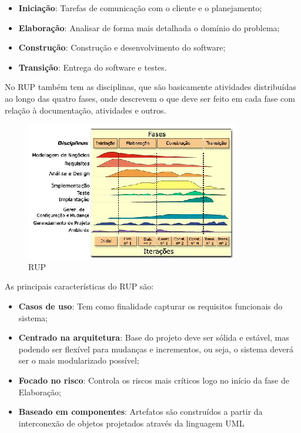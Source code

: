   \begin{itemize}
    \item \textbf{Iniciação}: Tarefas de comunicação com o cliente e o planejamento;
    \item \textbf{Elaboração}: Analisar de forma mais detalhada o domínio do problema;
    \item \textbf{Construção}: Construção e desenvolvimento do software;
    \item \textbf{Transição}: Entrega do software e testes.
  \end{itemize}

  No RUP também tem as disciplinas, que são basicamente atividades distribuídas ao longo das quatro fases, onde descrevem o que deve ser
  feito em cada fase com relação à documentação, atividades e outros.

  \begin{figure}[!htpb]
    \centering
    \includegraphics[scale=2.0]{figuras/abordagem/Fases_RUP}
    \caption{RUP}
  \end{figure}

  As principais características do RUP são:

  \begin{itemize}
    \item \textbf{Casos de uso}: Tem como finalidade capturar os requisitos funcionais do sistema;
    \item \textbf{Centrado na arquitetura}: Base do projeto deve ser sólida e estável, mas podendo ser flexível para mudanças e incrementos, ou seja, o sistema deverá ser o mais modularizado possível;
    \item \textbf{Focado no risco}: Controla os riscos mais críticos logo no início da fase de Elaboração;
    \item \textbf{Baseado em componentes}: Artefatos são construídos a partir da interconexão de objetos projetados através da linguagem UML
  \end{itemize}

